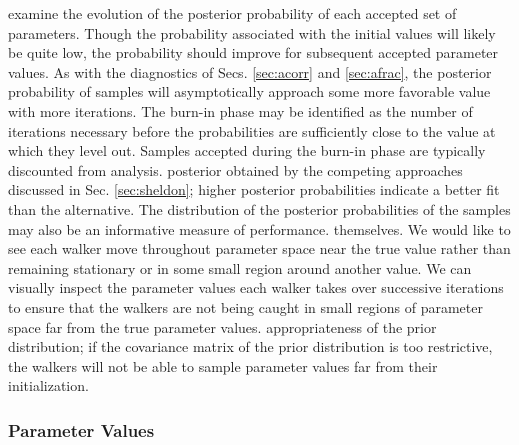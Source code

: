 \documentclass[preprint]{aastex}
\begin{document}
%
examine the evolution of the posterior probability of each accepted set of 
parameters.  Though the probability associated with the initial values will 
likely be quite low, the probability should improve for subsequent accepted 
parameter values.  As with the diagnostics of Secs. \ref{sec:acorr} and 
\ref{sec:afrac}, the posterior probability of samples will asymptotically 
approach some more favorable value with more iterations.  The burn-in phase may 
be identified as the number of iterations necessary before the probabilities 
are sufficiently close to the value at which they level out.  Samples accepted 
during the burn-in phase are typically discounted from analysis.  
%
posterior obtained by the competing approaches discussed in Sec. 
\ref{sec:sheldon}; higher posterior probabilities indicate a better fit than 
the alternative.  The distribution of the posterior probabilities of the 
samples may also be an informative measure of performance.
%
%
themselves.  We would like to see each walker move throughout parameter space 
near the true value rather than remaining stationary or in some small region 
around another value.  We can visually inspect the parameter values each walker 
takes over successive iterations to ensure that the walkers are not being 
caught in small regions of parameter space far from the true parameter values.  
%
appropriateness of the prior distribution; if the covariance matrix of the 
prior distribution is too restrictive, the walkers will not be able to sample 
parameter values far from their initialization.  
%
\subsubsection{Parameter Values}
\label{sec:samps}
\end{document}
